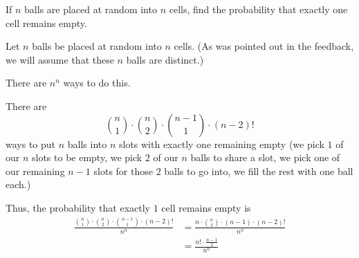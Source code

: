 \begin{problem}[Handout 2, \# 12]
  If \(n\) balls are placed at random into \(n\) cells, find the
  probability that exactly one cell remains empty.
\end{problem}
\begin{solution}
  Let $n$ balls be placed at random into $n$ cells. (As was pointed out in
  the feedback, we will assume that these $n$ balls are distinct.)

  There are $n^n$ ways to do this.

  There are
  \[
    \binom{n}{1} \cdot \binom{n}{2} \cdot \binom{n-1}{1} \cdot (n-2)!
  \]
  ways to put $n$ balls into $n$ slots with exactly one remaining empty (we
  pick $1$ of our $n$ slots to be empty, we pick $2$ of our $n$ balls to
  share a slot, we pick one of our remaining $n-1$ slots for those $2$
  balls to go into, we fill the rest with one ball each.)

  Thus, the probability that exactly $1$ cell remains empty is
  \begin{align*}
    \frac{\binom{n}{1} \cdot \binom{n}{2} \cdot \binom{n-1}{1} \cdot (n-2)!}{n^n} &= \frac{n \cdot \binom{n}{2} \cdot (n-1) \cdot (n-2)!}{n^n} \\
                                                                                  &= \frac{n! \cdot \frac{n-1}{2}}{n^n} \\
\end{align*}
\end{solution}
\newpage


